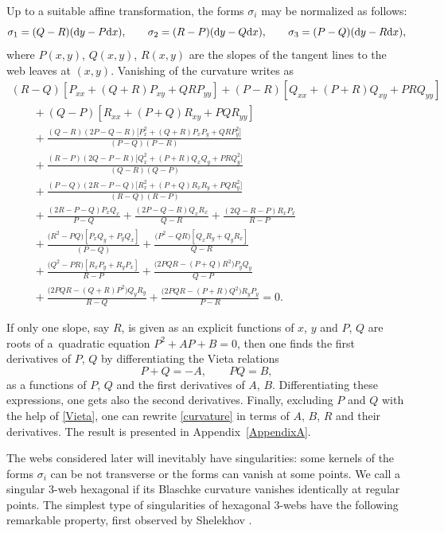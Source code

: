 Up to a suitable affine transformation, the forms $\sigma_i$ may be normalized as follows:
\[
\sigma_1=(Q - R)({\rm d}y - P{\rm d}x), \qquad \sigma_2=(R - P)({\rm d}y - Q{\rm d}x), \qquad \sigma_3=(P - Q)({\rm d}y - R{\rm d}x),
\]
where $P(x,y)$, $Q(x,y)$, $R(x,y)$ are the slopes of the tangent lines to the web leaves at $(x,y)$. Vanishing of the curvature writes as
\begin{gather}
(R-Q )[P_{xx} +(Q + R)P_{xy} +QRP_{yy}]+(P-R)[Q_{xx} +(P + R)Q_{xy}+PRQ_{yy}]\nonumber\\
\qquad{}+ (Q - P)[R_{xx} +(P + Q)R_{xy}+PQR_{yy}]\nonumber\\
\qquad{}+ \frac{(Q - R)(2P - Q - R)\bigl[P^2_x+(Q+R)P_xP_y+QRP^2_y\bigr]}{(P-Q )(P - R)}\nonumber \\
\qquad{} +
 \frac{(R-P )(2Q -P- R)\bigl[Q^2_x+(P+R)Q_xQ_y+PRQ_y^2\bigr]}{(Q - R)(Q-P)}
\nonumber \\
\qquad{}+ \frac{(P - Q)(2R-P-Q)\bigl[R_x^2+(P+Q)R_xR_y+PQR_y^2\bigr]}{(R-Q)(R - P)} \nonumber\\
\qquad{}+
\frac{(2R-P-Q)P_xQ_x }{P-Q}+
 \frac{(2P-Q-R)Q_xR_x}{Q - R}+
 \frac{(2Q-R-P)R_xP_x}{R-P} \nonumber\\
\qquad{}+ \frac{ \bigl(R^2-PQ\bigr)[P_xQ_y+P_yQ_x]}{(P - Q)} +
 \frac{\bigl(P^2 - QR\bigr)[Q_xR_y+Q_yR_x]}{Q-R} \nonumber\\
\qquad{} +
 \frac{\bigl(Q^2-PR\bigr)[R_xP_y+R_yP_x]}{R-P} + \frac{\bigl(2PQR -(P+Q)R^2\bigr)P_yQ_y}{Q-P}\nonumber\\
 \qquad{} +
\frac{\bigl(2PQR-(Q+R)P^2\bigr)Q_yR_y}{R-Q} +
\frac{\bigl(2PQR-(P+R)Q^2\bigr)R_yP_y }{P-R} =0.\label{curvature}
\end{gather}

If only one slope, say $R$, is given as an explicit functions of $x$, $y$ and $P$, $Q$ are roots of a~quadratic equation $P^2+AP+B=0$, then one finds the first derivatives of $P$, $Q$ by differentiating the Vieta relations
\begin{equation}\label{Vieta}
P+Q=-A,\qquad PQ=B,
\end{equation}
as a functions of $P$, $Q$ and the first derivatives of $A$, $B$. Differentiating these expressions, one gets also the second derivatives. Finally, excluding $P$ and $Q$ with the help of \eqref{Vieta}, one can rewrite \eqref{curvature} in terms of $A$, $B$, $R$ and their derivatives. The result is presented in Appendix~\ref{AppendixA}.

The webs considered later will inevitably have singularities: some kernels of the forms $\sigma_i$ can be not transverse or the forms can vanish at some points. We call a singular 3-web hexagonal if its Blaschke curvature vanishes identically at regular points. The simplest type of singularities of hexagonal 3-webs have the following remarkable property, first observed by Shelekhov \cite{S-05}.

